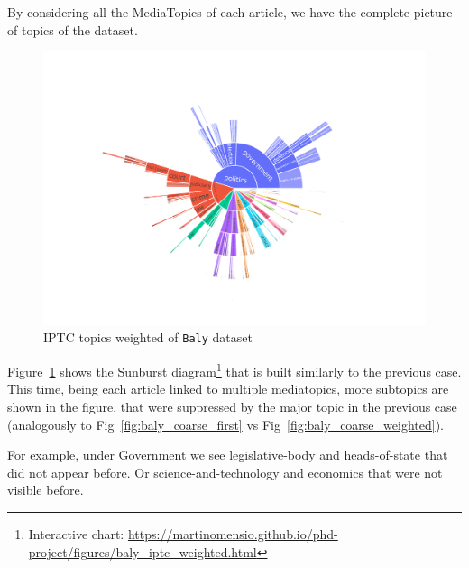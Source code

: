 By considering all the MediaTopics of each article, we have the complete picture of topics of the dataset. 

\begin{figure}[!htbp]
    \centering
    \includegraphics[trim={2.2cm 2cm 2.2cm 2cm},clip,width=\linewidth]{figures/baly_iptc_weighted.pdf}
    \caption{IPTC topics weighted of \texttt{Baly} dataset}
    \label{fig:baly_iptc_weighted}
\end{figure}

Figure~\ref{fig:baly_iptc_weighted} shows the Sunburst diagram\footnote{Interactive chart: \url{https://martinomensio.github.io/phd-project/figures/baly_iptc_weighted.html}} that is built similarly to the previous case. This time, being each article linked to multiple mediatopics, more subtopics are shown in the figure, that were suppressed by the major topic in the previous case (analogously to Fig~\ref{fig:baly_coarse_first} vs Fig~\ref{fig:baly_coarse_weighted}).

For example, under Government we see legislative-body and heads-of-state that did not appear before. Or science-and-technology and economics that were not visible before.




